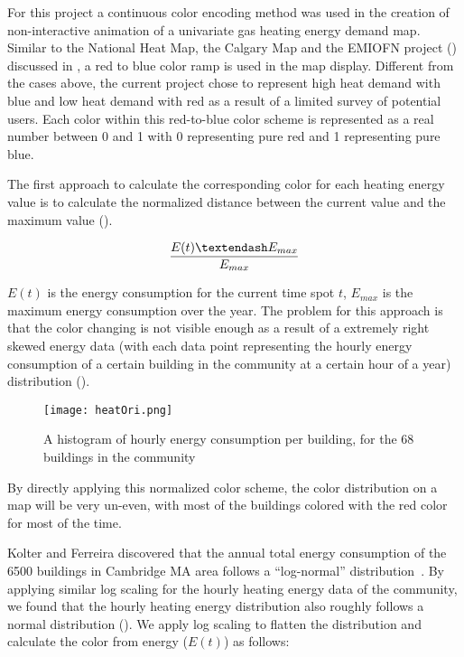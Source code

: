 For this project a continuous color encoding method was used in the
creation of non-interactive animation of a univariate gas heating
energy demand map. Similar to the National Heat Map, the Calgary Map
and the EMIOFN project () discussed in
, a red to blue color ramp is used in the map
display. Different from the cases above, the current project chose to
represent high heat demand with blue and low heat demand with red as a
result of a limited survey of potential users. Each color within this
red-to-blue color scheme is represented as a real number between 0 and
1 with 0 representing pure red and 1 representing pure blue.

The first approach to calculate the corresponding color for each
heating energy value is to calculate the normalized distance between
the current value and the maximum value ().

\begin{equation}\label{eq:linear}
  {E(t) – E_{max} \over E_{max}}
\end{equation}

$E(t)$ is the energy consumption for the current time spot $t$,
$E_{max}$ is the maximum energy consumption over the year. The problem
for this approach is that the color changing is not visible enough as
a result of a extremely right skewed energy data (with each data point
representing the hourly energy consumption of a certain building in
the community at a certain hour of a year) distribution
().

\begin{figure}[h!]
  \centering
  \texttt{[image: heatOri.png]}
  \caption[Heating Demand Histogram of Conceptual City]{A histogram of
    hourly energy consumption per building, for the 68 buildings in
    the community}
  \label{fig:heatOri}
\end{figure}

By directly applying this normalized color scheme, the color
distribution on a map will be very un-even, with most of the buildings
colored with the red color for most of the time.

Kolter and Ferreira discovered that the annual total energy
consumption of the 6500 buildings in Cambridge MA area follows a
``log-normal'' distribution~\cite{Zico2011}. By applying similar log
scaling for the hourly heating energy data of the community, we found
that the hourly heating energy distribution also roughly follows a
normal distribution (). We apply log scaling to
flatten the distribution and calculate the color from energy
($E(t)$) as follows:

